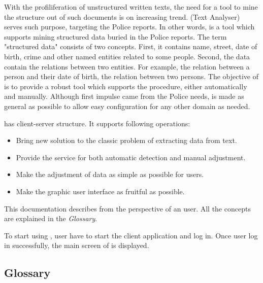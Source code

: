 With the profiliferation of unstructured written texts, the need for a tool to mine the structure out of such documents is on increasing trend. 
\textan{} (Text Analyser) serves such purpose, targeting the Police reports. 
In other words, \textan{} is a tool which supports mining structured data buried in the Police reports. The term "structured data" consists of two concepts. 
First, it contains name, street, date of birth, crime and other named entities related to some people. 
Second, the data contain the relations between two entities. 
For example, the relation between a person and their date of birth, the relation between two persons. The objective of \textan{} is to provide a robust tool which supports the procedure, either automatically and manually.
Although first impulse came from the Police needs, \textan{} is made as general
as possible to allow easy configuration for any other domain as needed.

\textan{} has client-server structure. It supports following operations:
  
  \begin{itemize}
  \item Bring new solution to the classic problem of extracting data from text.
  \item Provide the service for both automatic detection and manual adjustment.
  \item Make the adjustment of data as simple as possible for users.
  \item Make the graphic user interface as fruitful as possible.
  \end{itemize}

This documentation describes \textan{} from the perspective of an user. 
All the concepts are explained in the \emph{Glossary}.

To start using \textan{}, user have to start the client application and log in. 
Once user log in successfully, the main screen of \textan{} is displayed.


\subsection{Glossary}

